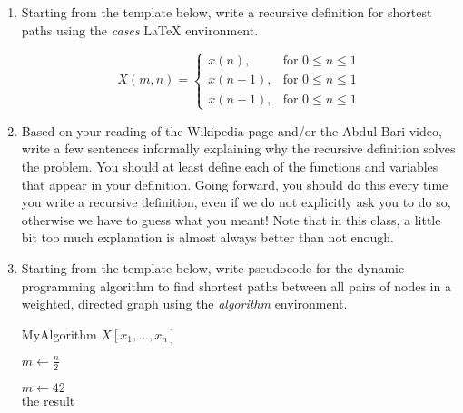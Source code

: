 \documentclass[11pt]{article}
\theoremstyle{definition}
\theoremstyle{theorem}
\newcommand{\solution}{\medskip\noindent{\color{DarkBlue}\textbf{Solution:}}}
\begin{document}
\begin{enumerate} [label=(\alph*)]
	\item Starting from the template below, write a recursive definition for shortest paths using the \emph{cases} LaTeX environment. 
	
		\solution
		
			$$
			X(m, n) = 
			\begin{cases}
			x(n), & \text{for } 0 \leq n \leq 1 \\
			x(n - 1), & \text{for } 0 \leq n \leq 1 \\
			x(n - 1), & \text{for } 0 \leq n \leq 1
			\end{cases}
			$$
	
	
	\item Based on your reading of the Wikipedia page and/or the Abdul Bari video, write a few sentences informally explaining why the recursive definition solves the problem. You should at least define each of the functions and variables that appear in your definition. Going forward, you should do this every time you write a recursive definition, even if we do not explicitly ask you to do so, otherwise we have to guess what you meant! Note that in this class, a little bit too much explanation is almost always better than not enough.
	
	\solution		
	
	
	\item Starting from the template below, write pseudocode for the dynamic programming algorithm to find shortest paths between all pairs of nodes in a weighted, directed graph using the \emph{algorithm} environment.
	
	\solution
	
	    \begin{algorithm}[H] %
		\caption{MyAlgorithm $X[x_1, \ldots, x_n]$} %
		$m \gets  \frac{n}{2}$  \\ %
		
		$m \gets 42$ \\
		\Return the result %
	\end{algorithm}



\end{enumerate}
\end{document}
